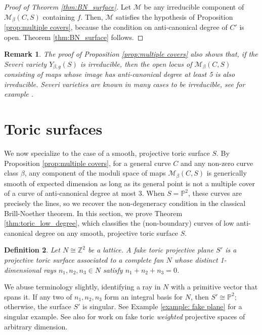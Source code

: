 \documentclass[12pt]{amsart}
\def\cM{{\mathcal{M}}}
\def\Z{\mathbb{Z}}
\def\P{\mathbb{P}}
\newtheorem{definition}{Definition}[section]
\newtheorem{remark}[definition]{Remark}
\begin{document}
 \begin{proof}[Proof of Theorem \ref{thm:BN_surface}]
Let $\cM$ be any irreducible component of $\cM_\beta(C,S)$ containing $f$. Then, $\cM$ satisfies the hypothesis of Proposition \ref{prop:multiple covers}, because the condition on anti-canonical degree of $C'$ is open. Theorem \ref{thm:BN_surface} follows.
 \end{proof}

\begin{remark}
    The proof of Proposition \ref{prop:multiple covers} also shows that, if the Severi variety $Y_{\beta,g}(S)$ is irreducible, then the open locus of $\cM_\beta(C,S)$ consisting of maps whose image has anti-canonical degree at least 5 is also irreducible. Severi varieties are known in many cases to be irreducible, see for example \cite{harris_severi,testa,cd_severi,cht1,cht2}.
\end{remark}

\section{Toric surfaces}\label{sec:toric_surface}

We now specialize to the case of a smooth, projective toric surface $S$. By Proposition \ref{prop:multiple covers}, for a general curve $C$ and any non-zero curve class $\beta$, any component of the moduli space of maps $\cM_{\beta}(C,S)$ is generically smooth of expected dimension as long as its general point is not a multiple cover of a curve of anti-canonical degree at most 3. When $S=\P^2$, these curves are precisely the lines, so we recover the non-degeneracy condition in the classical Brill-Noether theorem. In this section, we prove Theorem \ref{thm:toric_low_degree}, which classifies the (non-boundary) curves of low anti-canonical degree on any smooth, projective toric surface $S$.

\begin{definition}\label{def:fake_P2}
Let $N\cong\Z^2$ be a lattice. A \emph{fake toric projective plane} $S'$ is a projective toric surface associated to a complete fan $N$ whose distinct 1-dimensional rays $n_1,n_2,n_3\in N$ satisfy $n_1+n_2+n_3=0$.
\end{definition}

We abuse terminology slightly, identifying a ray in $N$ with a primitive vector that spans it. If any two of $n_1,n_2,n_3$ form an integral basis for $N$, then $S'\cong\mathbb{P}^2$; otherwise, the surface $S'$ is singular. See Example \ref{example: fake plane} for a singular example. See also \cite{buzynska,conrads,kasprzyk,cgkn,bauerle} for work on fake toric \emph{weighted} projective spaces of arbitrary dimension.
\end{document}
